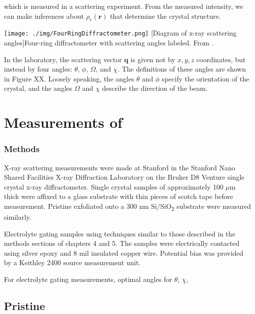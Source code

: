 which is measured in a scattering experiment. From the measured intensity, we can make inferences about $\rho_{e}(\mathbf{r})$ that determine the crystal structure.

\begin{centering}
\texttt{[image: ./img/FourRingDiffractometer.png]}
  \captionsetup{width=0.75\textwidth}
  [Diagram of x-ray scattering angles]{Four-ring diffractometer with scattering angles labeled. From \cite{Clark2007}.} 
  \label{fig:XrayIntro-4}
\end{centering}

In the laboratory, the scattering vector $\mathbf{q}$ is given not by  $x,y,z$ coordinates, but instead by four angles: $\theta$, $\phi$, $\Omega$, and $\chi$. The definitions of these angles are shown in Figure XX. Loosely speaking, the angles $\theta$ and $\phi$ specify the orientation of the crystal, and the angles $\Omega$ and $\chi$ describe the direction of the beam.

\section{Measurements of \rucl}



\subsubsection{Methods}
X-ray scattering measurements were made at Stanford in the Stanford Nano Shared Facilities X-ray Diffraction Laboratory on the Bruker D8 Venture single crystal x-ray diffractometer. Single crystal samples of \rucl approximately 100 $\mu$m thick were affixed to a glass substrate with thin pieces of scotch tape before measurement. Pristine \rucl exfoliated onto a 300 nm Si/SiO\textsubscript{2} substrate were measured similarly.

Electrolyte gating samples using techniques similar to those described in the methods sections of chapters 4 and 5. The samples were electrically contacted using silver epoxy and 8 mil insulated copper wire. Potential bias was provided by a Keithley 2400 source measurement unit.

For electrolyte gating measurements, optimal angles for $\theta$, $\chi$,

\subsection{Pristine \rucl}

